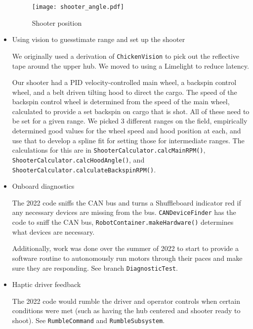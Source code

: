\documentclass[]{article}
\newcommand{\zztt}[1]{{\texttt{\footnotesize{#1}}}}
\begin{document}
\begin{itemize}[topsep=0pt]
\begin{figure}[!thbp]
	\begin{mdframed}
		\begin{center}
			\texttt{[image: shooter\_angle.pdf]}
		\end{center}
		\caption{Shooter position}
		\label{fig:shooter2}
	\end{mdframed}
\end{figure}

\pagebreak

\item Using vision to guesstimate range and set up the shooter

We originally used a derivation of \zztt{ChickenVision} to pick out the reflective tape around the upper hub. We moved to using a Limelight to reduce latency.

Our shooter had a PID velocity-controlled main wheel, a backspin control wheel, and a belt driven tilting hood to direct the cargo. The speed of the backspin control wheel is determined from the speed of the main wheel, calculated to provide a set backspin on cargo that is shot. All of these need to be set for a given range. We picked 3 different ranges on the field, empirically determined good values for the wheel speed and hood position at each, and use that to develop a spline fit for setting those for intermediate ranges. The calculations for this are in \zztt{ShooterCalculator.calcMainRPM()}, \zztt{ShooterCalculator.calcHoodAngle()},  and \zztt{ShooterCalculator.calculateBackspinRPM()}.

\item Onboard diagnostics

The 2022 code sniffs the CAN bus and turns a Shuffleboard indicator red if any necessary devices are missing from the bus. \zztt{CANDeviceFinder} has the code to sniff the CAN bus, \zztt{RobotContainer.makeHardware()} determines what devices are necessary.

Additionally, work was done over the summer of 2022 to start to provide a software routine to autonomously run motors through their paces and make sure they are responding. See branch \zztt{DiagnosticTest}.

\item Haptic driver feedback

The 2022 code would rumble the driver and operator controls when certain conditions were met (such as having the hub centered and shooter ready to shoot). See \zztt{RumbleCommand} and \zztt{RumbleSubsystem}.


\end{itemize}
\end{document}
